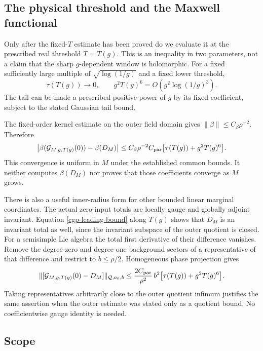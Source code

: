 \documentclass[11pt]{article}
\theoremstyle{remark}
\begin{document}
\subsection{The physical threshold and the Maxwell functional}
\label{cgp-Maxwell-section}

Only after the fixed-$T$ estimate has been proved do we evaluate
it at the prescribed real threshold $T=T(g)$. This is an
inequality in two parameters, not a claim that the sharp
$g$-dependent window is holomorphic. For a fixed sufficiently
large multiple of $\sqrt{\log(1/g)}$ and a fixed lower
threshold,
\[
 \tau(T(g))\longrightarrow0,\qquad
          g^2T(g)^6=O\!\left(g^2\log(1/g)^3\right).
\]
The tail can be made a prescribed positive power of $g$
by its fixed coefficient, subject to the stated Gaussian
tail bound.

The fixed-order kernel estimate on the outer field domain gives
$\|\beta\|\le C_\beta\rho^{-2}$. Therefore
\begin{equation}
 \left|\beta(\mathcal G_{M,g,T(g)}(0))-\beta(D_M)\right|
 \le C_\beta\rho^{-2}C_{\rm par}
                \bigl[\tau(T(g))+g^2T(g)^6\bigr].
 \label{cgp-beta-bound}
\end{equation}
This convergence is uniform in $M$ under the established
common bounds. It neither computes $\beta(D_M)$ nor proves
that those coefficients converge as $M$ grows.

There is also a useful inner-radius form for other bounded
linear marginal coordinates. The actual zero-input totals
are locally gauge and globally adjoint invariant.
Equation \eqref{cgp-leading-bound} along $T(g)$ shows that
$D_M$ is an invariant total as well, since the invariant
subspace of the outer quotient is closed. For a semisimple
Lie algebra the total first derivative of their difference
vanishes. Remove the degree-zero and degree-one background
sectors of a representative of that difference and restrict
to $b\le\rho/2$. Homogeneous phase projection gives
\begin{equation}
 \|[\mathcal G_{M,g,T(g)}(0)-D_M]\|_{\mathcal Q,a_0,b}
 \le \frac{2C_{\rm par}}{\rho^2}\,
       b^2\bigl[\tau(T(g))+g^2T(g)^6\bigr].
 \label{cgp-inner-bound}
\end{equation}
Taking representatives arbitrarily close to the outer
quotient infimum justifies the same assertion when the
outer estimate was stated only as a quotient bound.
No coefficientwise gauge identity is needed.

\subsection{Scope}
\label{cgp-scope-section}
\end{document}
